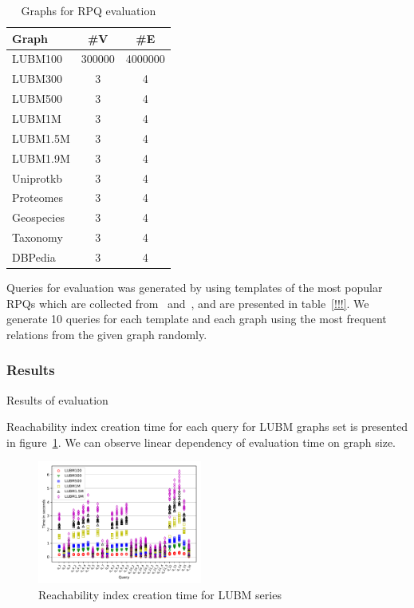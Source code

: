 \begin{table}
\begin{tabular}{|l|c|c|}
\hline
Graph & \#V & \#E \\
\hline
\hline 
LUBM100  & 300000 & 4000000 \\
LUBM300  & 3 & 4 \\
LUBM500  & 3 & 4 \\
LUBM1M   & 3 & 4 \\
LUBM1.5M & 3 & 4 \\
LUBM1.9M & 3 & 4 \\
\hline
Uniprotkb & 3 & 4 \\
Proteomes & 3 & 4 \\
\hline
Geospecies & 3 & 4 \\
Taxonomy & 3 & 4 \\
DBPedia & 3 & 4 \\
\hline
\end{tabular}
\caption{Graphs for RPQ evaluation}
\label{tbl:graphs_for_rpq}
\end{table}


Queries for evaluation was generated by using templates of the most popular RPQs which are collected from~
\cite{!!!} and~\cite{!!!}, and are presented in table~\ref{!!!}.
We generate 10 queries for each template and each graph using the most frequent relations from the given graph randomly.

\subsubsection{Results}

Results of evaluation

Reachability index creation time for each query for LUBM graphs set is presented in figure~\ref{fig:lubm_all_qs}.
We can observe linear dependency of evaluation time on graph size.


\begin{figure}
   \includegraphics[width=0.48\textwidth]{data/LUBM_all.pdf}
   \caption{Reachability index creation time for LUBM series}
   \label{fig:lubm_all_qs}
\end{figure}


